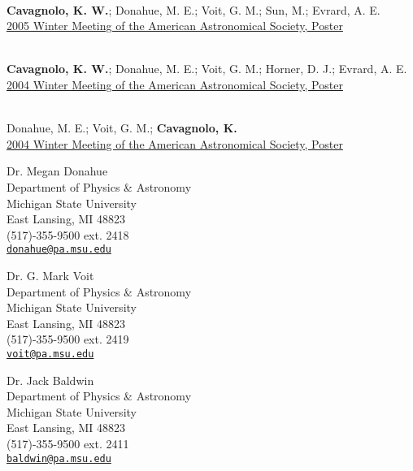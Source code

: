 \documentclass[11pt]{cv}
\begin{document}
\begin{llist}
{}\\
{\bf Cavagnolo, K. W.}; Donahue, M. E.; Voit, G. M.; Sun, M.; Evrard, A. E.\\
\href{http://adsabs.harvard.edu/abs/2005AAS...20713903C}{2005 Winter
Meeting of the American Astronomical Society, Poster}

{}\\
{\bf Cavagnolo, K. W.}; Donahue, M. E.; Voit, G. M.; Horner, D. J.; Evrard, A. E.\\
\href{http://adsabs.harvard.edu/abs/2004AAS...20514715C}{2004 Winter
Meeting of the American Astronomical Society, Poster}

{}\\
Donahue, M. E.; Voit, G. M.; {\bf Cavagnolo, K.}\\
\href{http://adsabs.harvard.edu/abs/2004AAS...205.6020D}{2004 Winter
Meeting of the American Astronomical Society, Poster}



{\sc Dr. Megan Donahue}\\
Department of Physics \& Astronomy\\
Michigan State University\\
East Lansing, MI 48823\\
(517)-355-9500 ext. 2418\\
\href{mailto:donahue@pa.msu.edu}{\tt donahue@pa.msu.edu}

{\sc Dr. G. Mark Voit}\\
Department of Physics \& Astronomy\\
Michigan State University\\
East Lansing, MI 48823\\
(517)-355-9500 ext. 2419\\
\href{mailto:voit@pa.msu.edu}{\tt voit@pa.msu.edu}

{\sc Dr. Jack Baldwin}\\
Department of Physics \& Astronomy\\
Michigan State University\\
East Lansing, MI 48823\\
(517)-355-9500 ext. 2411\\
\href{mailto:baldwin@pa.msu.edu}{\tt baldwin@pa.msu.edu}


\end{llist}
\end{document}
